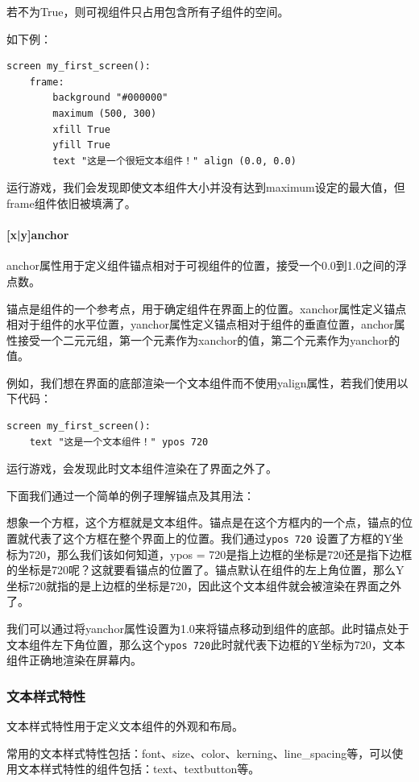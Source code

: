 \documentclass[../../Main.tex]{subfiles}
\begin{document}
若不为True，则可视组件只占用包含所有子组件的空间。

如下例：
\begin{lstlisting}
screen my_first_screen():
    frame:
        background "#000000"
        maximum (500, 300)
        xfill True
        yfill True
        text "这是一个很短文本组件！" align (0.0, 0.0)
\end{lstlisting}

运行游戏，我们会发现即使文本组件大小并没有达到maximum设定的最大值，但frame组件依旧被填满了。

\paragraph{[x|y]anchor}
anchor属性用于定义组件锚点相对于可视组件的位置，接受一个0.0到1.0之间的浮点数。

锚点是组件的一个参考点，用于确定组件在界面上的位置。xanchor属性定义锚点相对于组件的水平位置，yanchor属性定义锚点相对于组件的垂直位置，anchor属性接受一个二元元组，第一个元素作为xanchor的值，第二个元素作为yanchor的值。

例如，我们想在界面的底部渲染一个文本组件而不使用yalign属性，若我们使用以下代码：
\begin{lstlisting}
screen my_first_screen():
    text "这是一个文本组件！" ypos 720
\end{lstlisting}

运行游戏，会发现此时文本组件渲染在了界面之外了。

下面我们通过一个简单的例子理解锚点及其用法：

想象一个方框，这个方框就是文本组件。锚点是在这个方框内的一个点，锚点的位置就代表了这个方框在整个界面上的位置。我们通过\verb|ypos 720| 设置了方框的Y坐标为720，那么我们该如何知道，ypos = 720是指上边框的坐标是720还是指下边框的坐标是720呢？这就要看锚点的位置了。锚点默认在组件的左上角位置，那么Y坐标720就指的是上边框的坐标是720，因此这个文本组件就会被渲染在界面之外了。

我们可以通过将yanchor属性设置为1.0来将锚点移动到组件的底部。此时锚点处于文本组件左下角位置，那么这个\verb|ypos 720|此时就代表下边框的Y坐标为720，文本组件正确地渲染在屏幕内。



\subsubsection{文本样式特性}
文本样式特性用于定义文本组件的外观和布局。

常用的文本样式特性包括：font、size、color、kerning、line\_spacing等，可以使用文本样式特性的组件包括：text、textbutton等。
\end{document}
